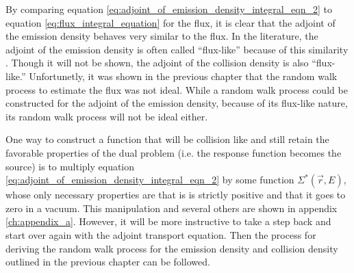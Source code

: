 By comparing equation \ref{eq:adjoint_of_emission_density_integral_eqn_2} to 
equation \ref{eq:flux_integral_equation} for the flux, it is clear that
the adjoint of the emission density behaves very similar to the flux. In the 
literature, the adjoint of the emission density is often called ``flux-like'' 
because of this similarity \citep{hoogenboom_adjoint_1977}. Though it will not 
be shown, the adjoint of the collision density is also ``flux-like.'' 
Unfortunetly, it was shown in the previous chapter that the random walk process 
to estimate the flux was not ideal. While a random walk process could be 
constructed for the adjoint of the emission density, because of its flux-like 
nature, its random walk process will not be ideal either. 

One way to construct a function that will be collision like and still retain
the favorable properties of the dual problem (i.e. the response function 
becomes the source) is to multiply equation 
\ref{eq:adjoint_of_emission_density_integral_eqn_2} by some function 
$\Sigma^{*}(\vec{r},E)$, whose only necessary properties are that is is
strictly positive and that it goes to zero in a vacuum. This manipulation and 
several others are shown in appendix \ref{ch:appendix_a}. However, it will be 
more instructive to take a step back and start over again with the adjoint 
transport equation. Then the process for deriving the random walk process for 
the emission density and collision density outlined in the previous chapter 
can be followed. 

